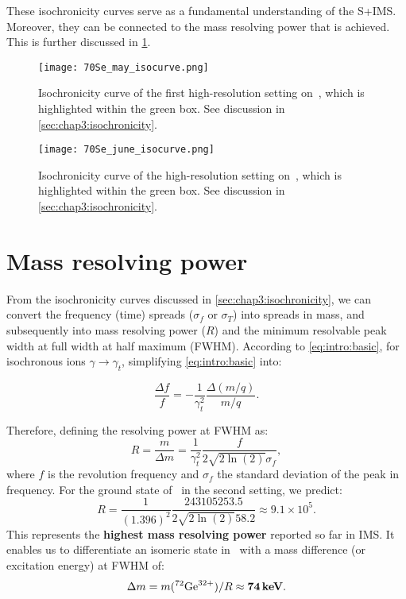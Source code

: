 These isochronicity curves serve as a fundamental understanding of the \textsc{S+IMS}. Moreover, they can be connected to the mass resolving power that is achieved. This is further discussed in \cref{sec:chap3:massresolvingpower}.

\begin{figure}[hbt]
\centering
\texttt{[image: 70Se\_may\_isocurve.png]}
\caption{Isochronicity curve of the first high-resolution setting on \,, which is highlighted within the green box. See discussion in \cref{sec:chap3:isochronicity}.}
\label{fig:chap3:iso70SeMay}
\end{figure}
  
\begin{figure}[hbt]
\centering
\texttt{[image: 70Se\_june\_isocurve.png]}
\caption{Isochronicity curve of the high-resolution setting on \,, which is highlighted within the green box. See discussion in \cref{sec:chap3:isochronicity}.}
\label{fig:chap3:iso70SeJune}
\end{figure}

\section{Mass resolving power}\label{sec:chap3:massresolvingpower}
From the isochronicity curves discussed in \cref{sec:chap3:isochronicity}, we can convert the frequency (time) spreads ($\sigma_f$ or $\sigma_T$) into spreads in mass, and subsequently into mass resolving power ($R$) and the minimum resolvable peak width at full width at half maximum (\textsc{FWHM}). According to \cref{eq:intro:basic}, for isochronous ions $\gamma \rightarrow \gamma_t$, simplifying \cref{eq:intro:basic} into:

\begin{equation}
\frac{\Delta{f}}{f}=-\frac{1}{\gamma_t^2}\frac{\Delta(m/q)}{m/q}.
\label{eq:chap3:basic_iso_particles}
\end{equation}

Therefore, defining the resolving power at \textsc{FWHM} as:
\begin{equation}
      R = \frac{m}{\Delta m} = \frac{1}{\gamma_t^2} \frac{f}{2\sqrt{2\ln(2)}\sigma_f},
\end{equation}
  where $f$ is the revolution frequency and $\sigma_f$ the standard deviation of the peak in frequency.
  For the ground state of \, in the second setting, we predict:
  \begin{equation}
      R  = \frac{1}{(1.396)^2} \frac{243105253.5}{2\sqrt{2\ln(2)}58.2} \approx 9.1 \times 10^5.
  \end{equation}
  This represents the \textbf{highest mass resolving power} reported so far in \textsc{IMS}.
  It enables us to differentiate an isomeric state in \, with a mass difference (or excitation energy) at \textsc{FWHM} of:
  \begin{equation}
    \Delta m = m(^{72}\mathrm{Ge}^{32+}) / R \approx \bm{74}\,\mathrm{\bf keV}.
  \end{equation}

